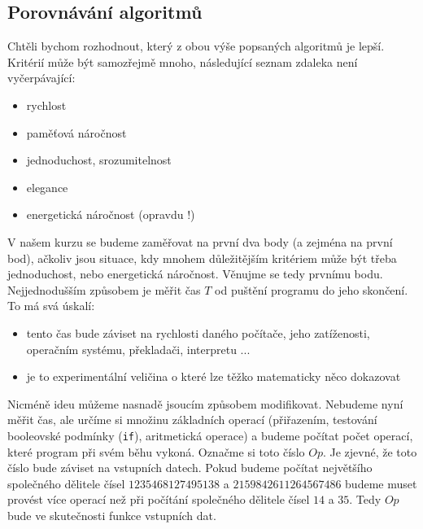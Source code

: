 \subsection{Porovnávání algoritmů} 
Chtěli bychom rozhodnout, který z obou výše popsaných algoritmů je lepší. Kritérií může být samozřejmě mnoho,
následující seznam zdaleka není vyčerpávající:

\begin{itemize}
 \item rychlost
 \item paměťová náročnost
 \item jednoduchost, srozumitelnost
 \item elegance
 \item energetická náročnost (opravdu !)
\end{itemize}

V našem kurzu se budeme zaměřovat na první dva body (a zejména na první bod), ačkoliv jsou situace, kdy mnohem důležitějším
kritériem může být třeba jednoduchost, nebo energetická náročnost. Věnujme se tedy prvnímu bodu. Nejjednodušším způsobem
je měřit čas $T$ od puštění programu do jeho skončení. To má svá úskalí:

\begin{itemize}
 \item tento čas bude záviset na rychlosti daného počítače, jeho zatíženosti, operačním systému, překladači, interpretu ...
 \item je to experimentální veličina o které lze těžko matematicky něco dokazovat
\end{itemize}

Nicméně ideu můžeme nasnadě jsoucím způsobem modifikovat. Nebudeme nyní měřit čas, ale určíme si množinu základních
operací (přiřazením, testování booleovské podmínky ({\tt if}), aritmetická operace) a budeme počítat počet operací, 
které program při svém běhu vykoná. Označme si toto číslo $Op$. Je zjevné, že 
toto číslo bude záviset na vstupních datech. Pokud budeme počítat největšího společného dělitele čísel
$1235468127495138$ a $2159842611264567486$ budeme muset provést více operací než při počítání společného dělitele čísel
$14$ a $35$. Tedy $Op$ bude ve skutečnosti funkce vstupních dat.

